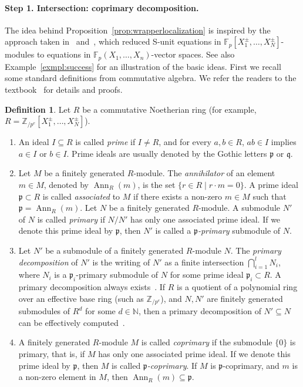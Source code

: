 \documentclass[letterpaper, 11pt, thm-restate]{article}
\numberwithin{equation}{section}
\newcommand{\N}{\mathbb{N}}
\newcommand{\F}{\mathbb{F}}
\newcommand{\Zpe}{\mathbb{Z}_{/p^e}}
\newcommand{\Ann}{\operatorname{Ann}}
\newcommand{\frp}{\mathfrak{p}}
\newcommand{\frq}{\mathfrak{q}}
\theoremstyle{definition}
\newtheorem{defn}[thrm]{Definition}
\theoremstyle{definition}
\theoremstyle{definition}
\begin{document}
\paragraph{Step 1. Intersection: coprimary decomposition.}

The idea behind Proposition~\ref{prop:wrapperlocalization} is inspired by the approach taken in~\cite{derksen2007skolem} and~\cite{dong2024submonoid}, which reduced S-unit equations in $\F_p[X_1^{\pm}, \ldots, X_N^{\pm}]$-modules to equations in $\F_p(X_1, \ldots, X_n)$-vector spaces.
See also Example~\ref{exmpl:success} for an illustration of the basic ideas.
First we recall some standard definitions from commutative algebra.
We refer the readers to the textbook~\cite{eisenbud2013commutative} for details and proofs.

\begin{defn}\label{def:commalg}
    Let $R$ be a commutative Noetherian ring (for example, $R = \Zpe[X_1^{\pm}, \ldots, X_N^{\pm}]$).
    \begin{enumerate}[nosep, label = (\arabic*)]
        \item An ideal $I \subseteq R$ is called \emph{prime} if $I \neq R$, and for every $a, b \in R$, $ab \in I$ implies $a \in I$ or $b \in I$. Prime ideals are usually denoted by the Gothic letters $\frp$ or $\frq$.
        \item Let $M$ be a finitely generated $R$-module. The \emph{annihilator} of an element $m \in M$, denoted by $\Ann_R(m)$, is the set $\{r \in R \mid r\cdot m = 0\}$.
        A prime ideal $\frp \subset R$ is called \emph{associated} to $M$ if there exists a non-zero $m \in M$ such that $\frp = \Ann_R(m)$. %
        Let $N$ be a finitely generated $R$-module. A submodule $N'$ of $N$ is called \emph{primary} if $N/N'$ has only one associated prime ideal. If we denote this prime ideal by $\frp$, then $N'$ is called a \emph{$\frp$-primary} submodule of $N$.
        \item Let $N'$ be a submodule of a finitely generated $R$-module $N$. The \emph{primary decomposition} of $N'$ is the writing of $N'$ as a finite intersection $\bigcap_{i = 1}^l N_i$, where $N_i$ is a $\frp_i$-primary submodule of $N$ for some prime ideal $\frp_i \subset R$.
        A primary decomposition always exists~\cite[Theorem~3.10]{eisenbud2013commutative}.
        If $R$ is a quotient of a polynomial ring over an effective base ring (such as $\Zpe$), and $N, N'$ are finitely generated submodules of $R^d$ for some $d \in \N$, then a primary decomposition of $N' \subseteq N$ can be effectively computed~\cite{rutman1992grobner}.       
        \item A finitely generated $R$-module $M$ is called \emph{coprimary} if the submodule $\{0\}$ is primary, that is, if $M$ has only one associated prime ideal. If we denote this prime ideal by $\frp$, then $M$ is called \emph{$\frp$-coprimary}.
        If $M$ is $\frp$-coprimary, and $m$ is a non-zero element in $M$, then $\Ann_R(m) \subseteq \frp$.
    \end{enumerate}
\end{defn}
\end{document}
